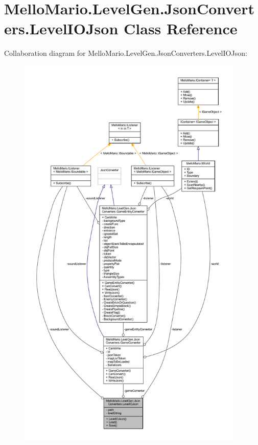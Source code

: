 \section{Mello\+Mario.\+Level\+Gen.\+Json\+Converters.\+Level\+I\+O\+Json Class Reference}
\label{classMelloMario_1_1LevelGen_1_1JsonConverters_1_1LevelIOJson}


Collaboration diagram for Mello\+Mario.\+Level\+Gen.\+Json\+Converters.\+Level\+I\+O\+Json\+:
\nopagebreak
\begin{figure}[H]
\begin{center}
\leavevmode
\includegraphics[height=550pt]{classMelloMario_1_1LevelGen_1_1JsonConverters_1_1LevelIOJson__coll__graph}
\end{center}
\end{figure}
